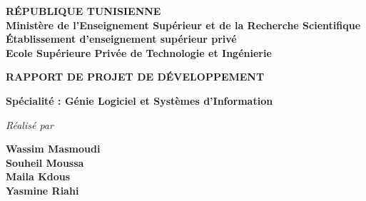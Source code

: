 

\begin{titlepage}
  \begin{center}


    \begin{center}
      \begin{minipage}{0.55\textwidth}
        \centering
        \footnotesize\textbf{
          RÉPUBLIQUE TUNISIENNE\\
          Ministère de l'Enseignement Supérieur et de la Recherche Scientifique\\
          Établissement d'enseignement supérieur privé\\
          Ecole Supérieure Privée de Technologie et Ingénierie
        }
      \end{minipage}
    \end{center}

    \vspace{2cm}


    {\Large\textbf{\textsc{RAPPORT DE PROJET DE DÉVELOPPEMENT}}}

    \vspace{1cm}

    {\small\textbf{Spécialité : Génie Logiciel et Systèmes d'Information}}

    \vspace{0.7cm}

    \textit{Réalisé par}

    \vspace{0.3cm}

    {\Large\textbf{Wassim Masmoudi}}\\
    {\Large\textbf{Souheil Moussa}}\\
    {\Large\textbf{Maila Kdous}}\\
    {\Large\textbf{Yasmine Riahi}}

    \vspace{0.6cm}



\end{center}
\end{titlepage}
